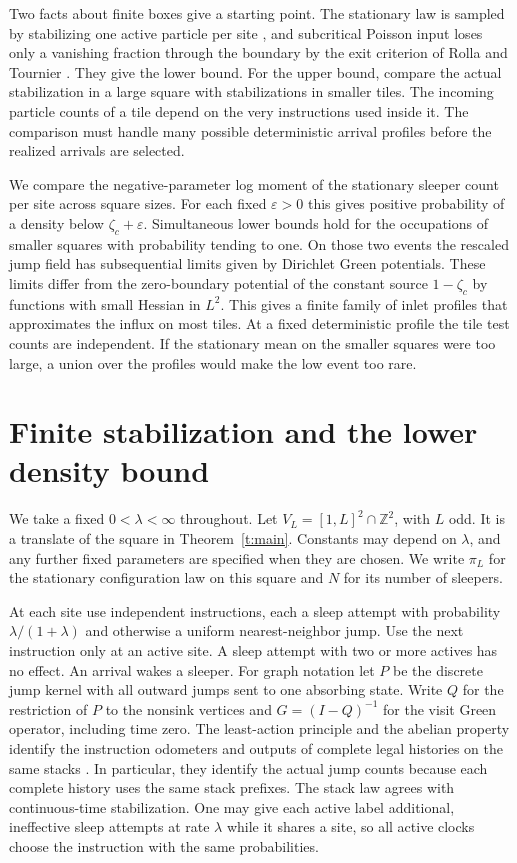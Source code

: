 \documentclass[11pt]{amsart}
\newcommand{\Z}{\mathbb Z}
\newcommand{\1}{\mathbf 1}
\begin{document}
Two facts about finite boxes give a starting point. The stationary law is sampled by stabilizing one active particle per site \cite{LL}, and subcritical Poisson input loses only a vanishing fraction through the boundary by the exit criterion of Rolla and Tournier \cite{RT}. They give the lower bound. For the upper bound, compare the actual stabilization in a large square with stabilizations in smaller tiles. The incoming particle counts of a tile depend on the very instructions used inside it. The comparison must handle many possible deterministic arrival profiles before the realized arrivals are selected.

We compare the negative-parameter log moment of the stationary sleeper count per site across square sizes. For each fixed \(\varepsilon>0\) this gives positive probability of a density below \(\zeta_c+\varepsilon\). Simultaneous lower bounds hold for the occupations of smaller squares with probability tending to one. On those two events the rescaled jump field has subsequential limits given by Dirichlet Green potentials. These limits differ from the zero-boundary potential of the constant source \(1-\zeta_c\) by functions with small Hessian in \(L^2\). This gives a finite family of inlet profiles that approximates the influx on most tiles. At a fixed deterministic profile the tile test counts are independent. If the stationary mean on the smaller squares were too large, a union over the profiles would make the low event too rare.

\section{Finite stabilization and the lower density bound}\label{s:finite}

We take a fixed \(0<\lambda<\infty\) throughout. Let \(V_L=[1,L]^2\cap\Z^2\), with \(L\) odd. It is a translate of the square in Theorem~\ref{t:main}. Constants may depend on \(\lambda\), and any further fixed parameters are specified when they are chosen. We write \(\pi_L\) for the stationary configuration law on this square and \(N\) for its number of sleepers.

At each site use independent instructions, each a sleep attempt with probability \(\lambda/(1+\lambda)\) and otherwise a uniform nearest-neighbor jump. Use the next instruction only at an active site. A sleep attempt with two or more actives has no effect. An arrival wakes a sleeper. For graph notation let \(P\) be the discrete jump kernel with all outward jumps sent to one absorbing state. Write \(Q\) for the restriction of \(P\) to the nonsink vertices and \(G=(I-Q)^{-1}\) for the visit Green operator, including time zero. The least-action principle and the abelian property identify the instruction odometers and outputs of complete legal histories on the same stacks \cite[\S1.3]{LL}. In particular, they identify the actual jump counts because each complete history uses the same stack prefixes. The stack law agrees with continuous-time stabilization. One may give each active label additional, ineffective sleep attempts at rate \(\lambda\) while it shares a site, so all active clocks choose the instruction with the same probabilities.
\end{document}
